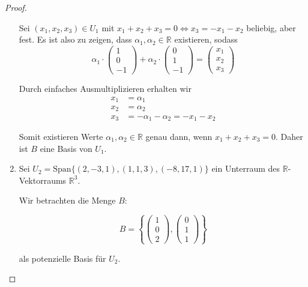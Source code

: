 \documentclass{../problemset}
\begin{document}
\begin{problem}
\begin{proof}
\begin{enumerate}
		      Sei $(x_1, x_2, x_3) \in U_1$ mit $x_1 + x_2 + x_3 = 0 \Leftrightarrow x_3 = - x_1 - x_2$ beliebig, aber fest. Es ist also zu zeigen, dass $\alpha_1, \alpha_2 \in \mathbb{R}$ existieren, sodass
		      \[
			      \alpha_1 \cdot \begin{pmatrix}
				      1 \\
				      0 \\
				      -1
			      \end{pmatrix} + \alpha_2 \cdot \begin{pmatrix}
				      0 \\
				      1 \\
				      -1
			      \end{pmatrix} = \begin{pmatrix}
				      x_1 \\
				      x_2 \\
				      x_3
			      \end{pmatrix}
		      \]

		      Durch einfaches Ausmultiplizieren erhalten wir
		      \begin{align*}
			      x_1 & = \alpha_1                                             \\
			      x_2 & = \alpha_2                                             \\
			      x_3 & = - \alpha_1 - \alpha_2 = - x_1 - x_2 \tag{\checkmark}
		      \end{align*}

		      Somit existieren Werte $\alpha_1, \alpha_2 \in \mathbb{R}$ genau dann, wenn $x_1 + x_2 + x_3 = 0$. Daher ist $B$ eine Basis von $U_1$.
		\item Sei $U_2 = \text{Span}\{(2, -3, 1), (1, 1, 3), (-8, 17, 1)\}$ ein Unterraum des $\mathbb{R}$-Vektorraums $\mathbb{R}^3$.

		      Wir betrachten die Menge $B$:

		      \[
			      B = \left\{
			      \begin{pmatrix}
				      1 \\ 0 \\ 2
			      \end{pmatrix},
			      \begin{pmatrix}
				      0 \\ 1 \\ 1
			      \end{pmatrix}
			      \right\}
		      \]

		      als potenzielle Basis für $U_2$.


\end{enumerate}
\end{proof}
\end{problem}
\end{document}
